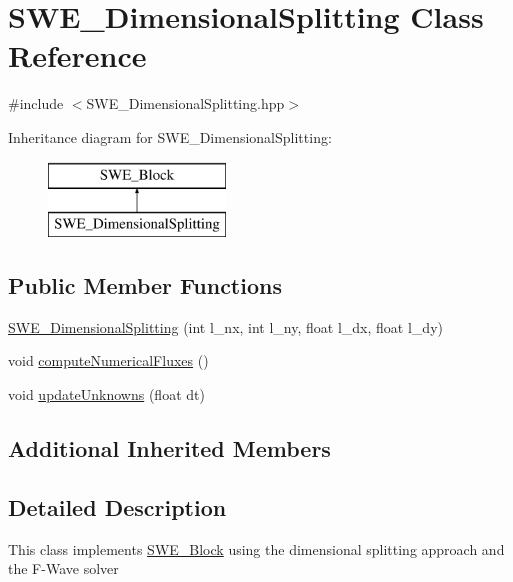 \hypertarget{classSWE__DimensionalSplitting}{\section{S\-W\-E\-\_\-\-Dimensional\-Splitting Class Reference}
\label{classSWE__DimensionalSplitting}
}


{\ttfamily \#include $<$S\-W\-E\-\_\-\-Dimensional\-Splitting.\-hpp$>$}

Inheritance diagram for S\-W\-E\-\_\-\-Dimensional\-Splitting\-:\begin{figure}[H]
\begin{center}
\leavevmode
\includegraphics[height=2.000000cm]{classSWE__DimensionalSplitting}
\end{center}
\end{figure}
\subsection*{Public Member Functions}
\begin{DoxyCompactItemize}
\item 
\hyperlink{classSWE__DimensionalSplitting_a3ab0c9de647ca241dbab1aa02cc42a04}{S\-W\-E\-\_\-\-Dimensional\-Splitting} (int l\-\_\-nx, int l\-\_\-ny, float l\-\_\-dx, float l\-\_\-dy)
\item 
void \hyperlink{classSWE__DimensionalSplitting_a84759f8fbbbfe1e46613375515826f0f}{compute\-Numerical\-Fluxes} ()
\item 
void \hyperlink{classSWE__DimensionalSplitting_af74b527ff9ca7727442db92d2e438531}{update\-Unknowns} (float dt)
\end{DoxyCompactItemize}
\subsection*{Additional Inherited Members}


\subsection{Detailed Description}
This class implements \hyperlink{classSWE__Block}{S\-W\-E\-\_\-\-Block} using the dimensional splitting approach and the F-\/\-Wave solver 

